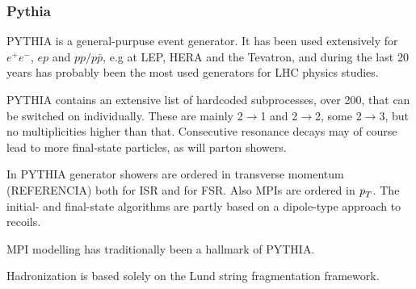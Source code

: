 \subsubsection{Pythia}

PYTHIA is a general-purpuse event generator. It has been used extensively for $e^+ e^-$, $ep$ and $pp/p\bar{p}$, e.g at LEP, HERA and the Tevatron, and during the last 20 years has probably been the most used generators for LHC physics studies. 


PYTHIA contains an extensive list of hardcoded subprocesses, over 200, that can be switched on individually. These are mainly 2$\rightarrow$1 and  2$\rightarrow$2, some  2$\rightarrow$3, but no multiplicities higher than that. Consecutive resonance decays may of course lead to more final-state particles, as will parton showers.

In PYTHIA generator showers are ordered in transverse momentum (REFERENCIA)%
both for ISR and for FSR. Also MPIs are ordered in ${\emph{p}_{T}}$.
The initial- and final-state algorithms are partly based on a dipole-type approach to recoils.

MPI modelling has traditionally been a hallmark of PYTHIA. 

Hadronization is based solely on the Lund string fragmentation framework.

